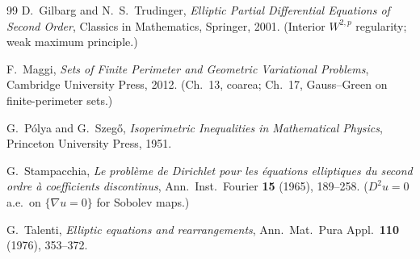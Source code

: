 \documentclass[11pt]{amsart}
\theoremstyle{definition}
\begin{document}
\begin{thebibliography}{99}
D.~Gilbarg and N.~S.~Trudinger,
\emph{Elliptic Partial Differential Equations of Second Order},
Classics in Mathematics, Springer, 2001.
(Interior \(W^{2,p}\) regularity; weak maximum principle.)

F.~Maggi,
\emph{Sets of Finite Perimeter and Geometric Variational Problems},
Cambridge University Press, 2012.
(Ch.~13, coarea; Ch.~17, Gauss--Green on finite-perimeter sets.)

G.~P\'olya and G.~Szeg\H{o},
\emph{Isoperimetric Inequalities in Mathematical Physics},
Princeton University Press, 1951.

G.~Stampacchia,
\emph{Le probl\`eme de Dirichlet pour les \'equations elliptiques du second
ordre \`a coefficients discontinus},
Ann.\ Inst.\ Fourier \textbf{15} (1965), 189--258.
(\(D^2u=0\) a.e.\ on \(\{\nabla u=0\}\) for Sobolev maps.)

G.~Talenti,
\emph{Elliptic equations and rearrangements},
Ann.\ Mat.\ Pura Appl.\ \textbf{110} (1976), 353--372.

\end{thebibliography}
\end{document}
